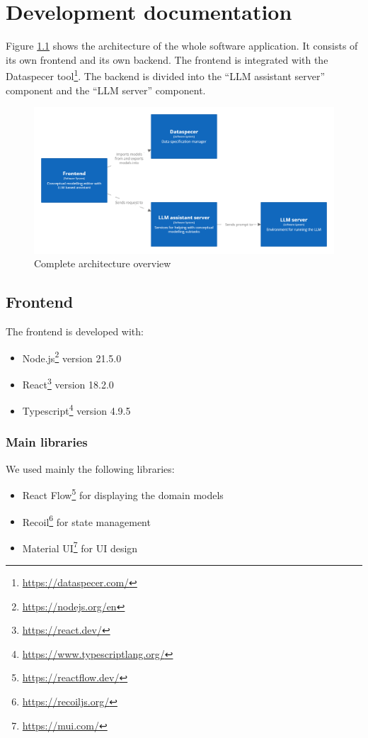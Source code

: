 \chapter{Development documentation}

Figure \ref{fig:complete_overview} shows the architecture of the whole software application. It consists of its own frontend and its own backend. The frontend is integrated with the Dataspecer tool\footnote{\url{https://dataspecer.com/}}. The backend is divided into the ``LLM assistant server'' component and the ``LLM server'' component.

\begin{figure}[!h]
    \includegraphics[scale=0.20]{../docs/images/architecture/complete-overview.png}
    \caption{\centering Complete architecture overview}
    \label{fig:complete_overview}
\end{figure}

\section{Frontend}

\noindent{}The frontend is developed with:
\begin{itemize}
\item Node.js\footnote{\url{https://nodejs.org/en}} version 21.5.0
\item React\footnote{\url{https://react.dev/}} version 18.2.0
\item Typescript\footnote{\url{https://www.typescriptlang.org/}} version 4.9.5
\end{itemize}


\subsection{Main libraries}

\noindent{}We used mainly the following libraries:
\begin{itemize}
\item React Flow\footnote{\url{https://reactflow.dev/}} for displaying the domain models
\item Recoil\footnote{\url{https://recoiljs.org/}} for state management
\item Material UI\footnote{\url{https://mui.com/}} for UI design
\end{itemize}


